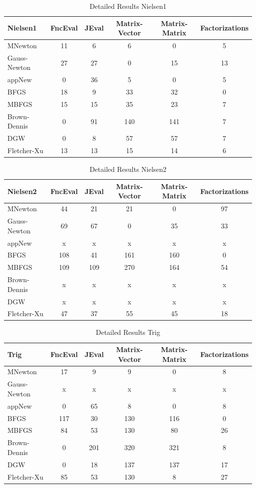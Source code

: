 \documentclass{article}
\theoremstyle{plain}%
\theoremstyle{definition}
\begin{document}
\begin{table}[H]
  \centering
 \begin{tabular}{|l|c|c|c|c|c|}
    \hline
  \textbf{Nielsen1} & FncEval &JEval& Matrix-Vector &Matrix-Matrix & Factorizations  \\ \hline
  MNewton &11&6&6&0&5 \\ \hline
Gauss-Newton &27&27&0&15&13 \\ \hline
 appNew &0&36&5&0&5 \\ \hline
 BFGS &18&9&33&32&0 \\ \hline
 MBFGS &15&15&35&23&7 \\ \hline
 Brown-Dennis &0&91&140&141&7 \\ \hline
 DGW &0&8&57&57&7 \\ \hline
 Fletcher-Xu &13&13&15&14&6 \\ \hline
  \end{tabular}
  \caption{Detailed Results Nielsen1}
  \label{tab:Nielsen1}
\end{table}
\begin{table}[H]
  \centering
 \begin{tabular}{|l|c|c|c|c|c|}
    \hline
  \textbf{Nielsen2} & FncEval &JEval& Matrix-Vector &Matrix-Matrix & Factorizations  \\ \hline
  MNewton &44&21&21&0&97 \\ \hline
Gauss-Newton &69&67&0&35&33 \\ \hline
 appNew &x&x&x&x&x \\ \hline
 BFGS &108&41&161&160&0 \\ \hline
 MBFGS &109&109&270&164&54 \\ \hline
 Brown-Dennis &x&x&x&x&x \\ \hline
 DGW &x&x&x&x&x \\ \hline
 Fletcher-Xu &47&37&55&45&18 \\ \hline
  \end{tabular}
  \caption{Detailed Results Nielsen2}
  \label{tab:Nielsen2}
\end{table}
\begin{table}[H]
  \centering
 \begin{tabular}{|l|c|c|c|c|c|}
    \hline
  \textbf{Trig} & FncEval &JEval& Matrix-Vector &Matrix-Matrix & Factorizations  \\ \hline
  MNewton &17&9&9&0&8 \\ \hline
Gauss-Newton &x&x&x&x&x \\ \hline
 appNew &0&65&8&0&8 \\ \hline
 BFGS &117&30&130&116&0 \\ \hline
 MBFGS &84&53&130&80&26 \\ \hline
 Brown-Dennis &0&201&320&321&8 \\ \hline
 DGW &0&18&137&137&17 \\ \hline
 Fletcher-Xu &85&53&130&8&27 \\ \hline
  \end{tabular}
  \caption{Detailed Results Trig}
  \label{tab:Trig}
\end{table}
\nocite{Nocedal2004}\nocite{Gille1978}\nocite{Fletcher1986}


\end{document}
